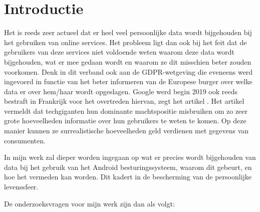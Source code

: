 
\section{Introductie} %
\label{sec:introductie}



Het is reeds zeer actueel dat er heel veel persoonlijke data wordt bijgehouden bij het gebruiken van online services. Het probleem ligt dan ook bij het feit dat de gebruikers van deze services niet voldoende weten waarom deze data wordt bijgehouden, wat er mee gedaan wordt en waarom ze dit misschien beter zouden voorkomen. Denk in dit verband ook aan de GDPR-wetgeving die eveneens werd ingevoerd in functie van het beter informeren van de Europese burger over welke data er over hem/haar wordt opgeslagen. Google werd begin 2019 ook reeds bestraft in Frankrijk voor het overtreden hiervan, zegt het artikel \autocite{Boete2019}. Het artikel \autocite{LaurensVerhagen2019} vermeldt dat techgiganten hun dominante machtspositie misbruiken om zo zeer grote hoeveelheden informatie over hun gebruikers te weten te komen. Op deze manier kunnen ze surrealistische hoeveelheden geld verdienen met gegevens van consumenten.

\vspace{3mm}

\noindent In mijn werk zal dieper worden ingegaan op wat er precies wordt bijgehouden van data bij het gebruik van het Android besturingssysteem, waarom dit gebeurt, en hoe het vermeden kan worden. Dit kadert in de bescherming van de persoonlijke levenssfeer. 

\vspace{3mm}

\noindent De onderzoeksvragen voor mijn werk zijn dan als volgt:


